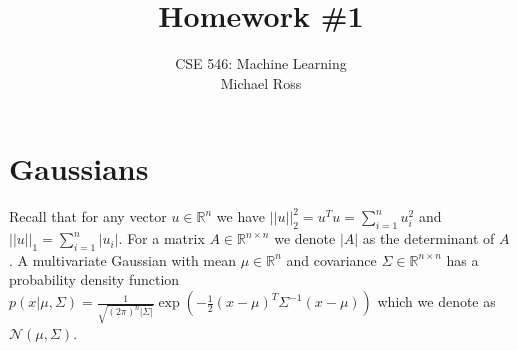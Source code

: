 \documentclass{article}
\date{{}}
\newcommand{\1}{\mathbf{1}}
\def\R{\mathbb{R}}
\begin{document}
\title{Homework \#1}
\author{\normalsize{CSE 546: Machine Learning}\\
\normalsize{Michael Ross}}
\maketitle


\section{Gaussians}
Recall that for any vector $u \in \R^n$ we have $||u||_2^2 = u^T u = \sum_{i=1}^n u_i^2$ and $||u||_1 = \sum_{i=1}^n |u_i|$. 
For a matrix $A \in \R^{n \times n}$ we denote $|A|$ as the determinant of $A$.
A multivariate Gaussian with mean $\mu \in \R^n$ and covariance $\Sigma \in \R^{n \times n}$ has a probability density function $p(x| \mu, \Sigma) =  \frac{1}{\sqrt{(2\pi)^n |\Sigma|}} \exp( -\frac{1}{2} (x-\mu)^T \Sigma^{-1} (x-\mu) )$ which we denote as $\mathcal{N}(\mu,\Sigma)$. \\
\end{document}

